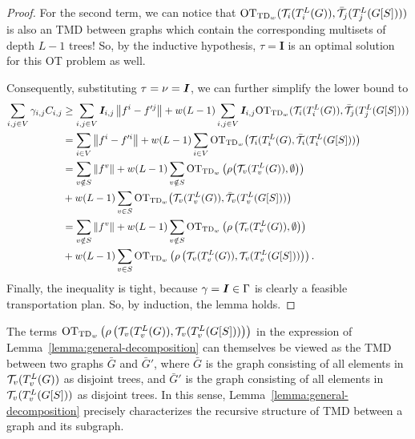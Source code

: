 \begin{proof}
For the second term, we can notice that $\textnormal{OT}_{\textnormal{TD}_{w}}{(\mathcal T_i(T_i^L(G)), \bar{\mathcal T}_j(T_j^L(G[S])))}$ is also an TMD between graphs which contain the corresponding multisets of depth $L-1$ trees! So, by the inductive hypothesis, $\tau = \bm{I}$ is an optimal solution for this OT problem as well. 

Consequently, substituting $\tau = \nu = \bm{I}$, we can further simplify the lower bound to 
\begin{align*}
    \sum_{i,j \in V} \gamma_{i,j} C_{i,j} &\geq \sum_{i,j\in V} \bm{I}_{i,j} \left\lVert f^i - f'^j\right\rVert + w(L-1) \sum_{i,j\in V} \bm{I}_{i,j} \textnormal{OT}_{\textnormal{TD}_{w}}{(\mathcal T_i(T_i^L(G)), \bar{\mathcal T}_j(T_j^L({G}[S])))} \\
    &= \sum_{i \in V}  \left\lVert f^i - f'^i\right\rVert + w(L-1) \sum_{i \in V} \textnormal{OT}_{\textnormal{TD}_{w}}{\left(\mathcal T_i(T_i^L(G), \bar{\mathcal T}_i(T_i^L(G[S])) \right )} \\
    &= \sum_{v \notin S}  \left\lVert f^v\right\rVert + w(L-1) \sum_{v \notin S} \textnormal{OT}_{\textnormal{TD}_{w}}\left(\rho{\left(\mathcal T_v(T_v^L(G)), \emptyset \right )} \right ) \\
    &+ w(L-1) \sum_{v \in S} \textnormal{OT}_{\textnormal{TD}_{w}}{\left(\mathcal T_v(T_v^L(G)), \bar{\mathcal T}_v(T_v^L(G[S])) \right )} \\
    &= \sum_{v \notin S}  \left\lVert f^v\right\rVert + w(L-1) \sum_{v \notin S} \textnormal{OT}_{\textnormal{TD}_{w}}\left(\rho\left(\mathcal T_v(T_v^L(G)), \emptyset \right ) \right ) \\
    &+ w(L-1) \sum_{v \in S} \textnormal{OT}_{\textnormal{TD}_{w}}\left(\rho\left(\mathcal T_v(T_v^L(G)), \mathcal T_v(T_v^L(G[S])) \right ) \right ). 
\end{align*}
Finally, the inequality is tight, because $\gamma = \bm{I} \in \Gamma$ is clearly a feasible transportation plan. So, by induction, the lemma holds. 
\end{proof}

\begin{remark}\label{remark:tmd-ot} The terms $\textnormal{OT}_{\textnormal{TD}_{w}}\left(\rho\left(\mathcal T_v(T_v^L(G)), \mathcal T_v(T_v^L(G[S])) \right ) \right )$ in the expression of Lemma~\ref{lemma:general-decomposition} can themselves be viewed as the TMD between two graphs $\bar{G}$ and $\bar{G}'$, where $\bar{G}$ is the graph consisting of all elements in $\mathcal T_v(T_v^L(G))$ as disjoint trees, and  $\bar{G}'$ is the graph consisting of all elements in $\mathcal T_v(T_v^L(G[S]))$ as disjoint trees. In this sense, Lemma~\ref{lemma:general-decomposition} precisely characterizes the recursive structure of TMD between a graph and its subgraph. 
\end{remark}

